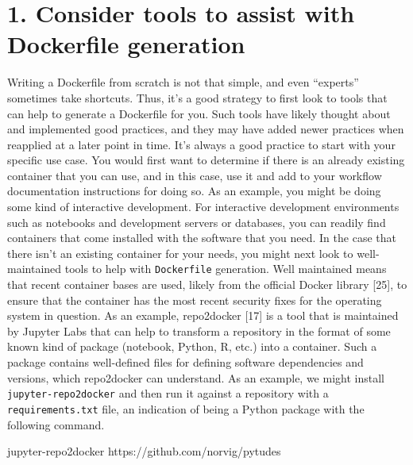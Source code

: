 \documentclass[10pt,letterpaper]{article}
\newenvironment{Shaded}{\begin{snugshade}}{\end{snugshade}}
\newcommand{\ExtensionTok}[1]{#1}
\newcommand{\NormalTok}[1]{#1}
\begin{document}
\hypertarget{consider-tools-to-assist-with-dockerfile-generation}{%
\section*{1. Consider tools to assist with Dockerfile
generation}\label{consider-tools-to-assist-with-dockerfile-generation}}

Writing a Dockerfile from scratch is not that simple, and even
``experts'' sometimes take shortcuts. Thus, it's a good strategy to
first look to tools that can help to generate a Dockerfile for you. Such
tools have likely thought about and implemented good practices, and they
may have added newer practices when reapplied at a later point in time.
It's always a good practice to start with your specific use case. You
would first want to determine if there is an already existing container
that you can use, and in this case, use it and add to your workflow
documentation instructions for doing so. As an example, you might be
doing some kind of interactive development. For interactive development
environments such as notebooks and development servers or databases, you
can readily find containers that come installed with the software that
you need. In the case that there isn't an existing container for your
needs, you might next look to well-maintained tools to help with
\texttt{Dockerfile} generation. Well maintained means that recent
container bases are used, likely from the official Docker library
{[}25{]}, to ensure that the container has the most recent security
fixes for the operating system in question. As an example, repo2docker
{[}17{]} is a tool that is maintained by Jupyter Labs that can help to
transform a repository in the format of some known kind of package
(notebook, Python, R, etc.) into a container. Such a package contains
well-defined files for defining software dependencies and versions,
which repo2docker can understand. As an example, we might install
\texttt{jupyter-repo2docker} and then run it against a repository with a
\texttt{requirements.txt} file, an indication of being a Python package
with the following command.

\begin{Shaded}
\begin{Highlighting}[]
\ExtensionTok{jupyter-repo2docker}\NormalTok{ https://github.com/norvig/pytudes}
\end{Highlighting}
\end{Shaded}
\end{document}
